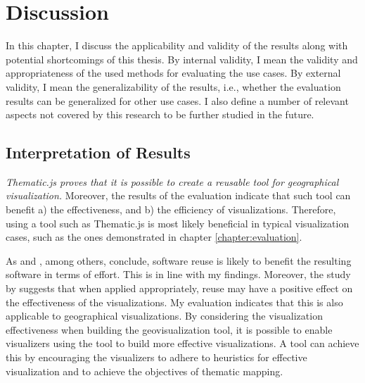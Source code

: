 
\chapter{Discussion}
\label{chapter:discussion}

In this chapter, I discuss the applicability and validity of the results along with potential shortcomings of this thesis. By internal validity, I mean the validity and appropriateness of the used methods for evaluating the use cases. By external validity, I mean the generalizability of the results, i.e., whether the evaluation results can be generalized for other use cases. I also define a number of relevant aspects not covered by this research to be further studied in the future.

\section{Interpretation of Results}

\emph{Thematic.js proves that it is possible to create a reusable tool for geographical visualization.} Moreover, the results of the evaluation indicate that such tool can benefit a) the effectiveness, and b) the efficiency of visualizations. Therefore, using a tool such as Thematic.js is most likely beneficial in typical visualization cases, such as the ones demonstrated in chapter \ref{chapter:evaluation}.

As \citet{boehm_managing_1999} and \citet{mohagheghi_quality_2007}, among others, conclude, software reuse is likely to benefit the resulting software in terms of effort. This is in line with my findings. Moreover, the study by \citet{bostock_protovis:_2009} suggests that when applied appropriately, reuse may have a positive effect on the effectiveness of the visualizations. My evaluation indicates that this is also applicable to geographical visualizations. By considering the visualization effectiveness when building the geovisualization tool, it is possible to enable visualizers using the tool to build more effective visualizations. A tool can achieve this by encouraging the visualizers to adhere to heuristics for effective visualization and to achieve the objectives of thematic mapping.


